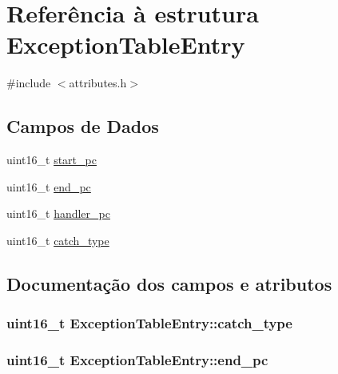\hypertarget{structExceptionTableEntry}{}\section{Referência à estrutura Exception\+Table\+Entry}
\label{structExceptionTableEntry}


{\ttfamily \#include $<$attributes.\+h$>$}

\subsection*{Campos de Dados}
\begin{DoxyCompactItemize}
\item 
uint16\+\_\+t \hyperlink{structExceptionTableEntry_a2b590ee5474b087686f851f10e3f8f06}{start\+\_\+pc}
\item 
uint16\+\_\+t \hyperlink{structExceptionTableEntry_a876e2f736b1b5f4f081ce96b2923f23e}{end\+\_\+pc}
\item 
uint16\+\_\+t \hyperlink{structExceptionTableEntry_a3fd0ed5cca1781e941594ef0af475add}{handler\+\_\+pc}
\item 
uint16\+\_\+t \hyperlink{structExceptionTableEntry_a7c5ab5cc44557c2e4b92c4643683205d}{catch\+\_\+type}
\end{DoxyCompactItemize}


\subsection{Documentação dos campos e atributos}
\subsubsection[{\texorpdfstring{catch\+\_\+type}{catch_type}}]{\setlength{\rightskip}{0pt plus 5cm}uint16\+\_\+t Exception\+Table\+Entry\+::catch\+\_\+type}\hypertarget{structExceptionTableEntry_a7c5ab5cc44557c2e4b92c4643683205d}{}\label{structExceptionTableEntry_a7c5ab5cc44557c2e4b92c4643683205d}
\subsubsection[{\texorpdfstring{end\+\_\+pc}{end_pc}}]{\setlength{\rightskip}{0pt plus 5cm}uint16\+\_\+t Exception\+Table\+Entry\+::end\+\_\+pc}\hypertarget{structExceptionTableEntry_a876e2f736b1b5f4f081ce96b2923f23e}{}\label{structExceptionTableEntry_a876e2f736b1b5f4f081ce96b2923f23e}
